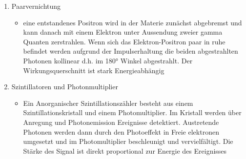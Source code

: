 \documentclass{article}
\begin{document}
\begin{enumerate}
            \item Paarvernichtung
            \begin{itemize}
                \item eine entstandenes Positron wird in der Materie zunächst abgebremst und kann danach mit einem Elektron unter Aussendung zweier gamma Quanten zerstrahlen.
                Wenn sich das Elektron-Positron paar in ruhe befindet werden aufgrund der Impulserhaltung die beiden abgestrahlten Photonen kollinear d.h. im 180° Winkel abgestrahlt.
                Der Wirkungsquerschnitt ist stark Energieabhängig
            \end{itemize}

            \item Szintillatoren und Photonmultiplier
            \begin{itemize}
                \item Ein Anorganischer Szintillationszähler besteht aus einem Szintillationskristall und einem Photomultiplier. Im Kristall werden über Anregung und Photonemission
                Ereignisse detektiert. Austretende Photonen werden dann durch den Photoeffekt in Freie elektronen umgesetzt und im Photomultiplier beschleunigt und vervielfältigt.
                Die Stärke des Signal ist direkt proportional zur Energie des Ereignisses
            \end{itemize}
        \end{enumerate}
\end{document}
